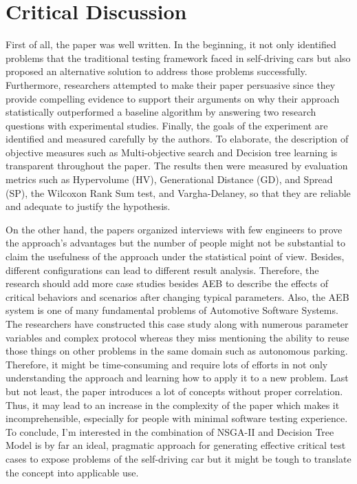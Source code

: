 \documentclass[10pt,a4paper]{report}
\begin{document}
\section{Critical Discussion}
First of all, the paper was well written. In the beginning, it not only identified problems that the traditional testing framework faced in self-driving cars but also proposed an alternative solution to address those problems successfully.
%
Furthermore, researchers attempted to make their paper persuasive since they provide compelling evidence to support their arguments on why their approach statistically outperformed a baseline algorithm by answering two research questions with experimental studies.  
%
Finally, the goals of the experiment are identified and measured carefully by the authors.
%
To elaborate, the description of objective measures such as Multi-objective search and Decision tree learning is transparent throughout the paper. 
%
The results then were measured by evaluation metrics such as Hypervolume (HV), Generational Distance (GD), and Spread (SP), the Wilcoxon Rank Sum test, and Vargha-Delaney, so that they are reliable and adequate to justify the hypothesis.
%

On the other hand, the papers organized interviews with few engineers to prove the approach's advantages but the number of people might not be substantial to claim the usefulness of the approach under the statistical point of view.
%
Besides, different configurations can lead to different result analysis. Therefore, the research should add more case studies besides AEB to describe the effects of critical behaviors and scenarios after changing typical parameters.
%
Also, the AEB system is one of many fundamental problems of Automotive Software Systems. 
%
The researchers have constructed this case study along with numerous parameter variables and complex protocol whereas they miss mentioning the ability to reuse those things on other problems in the same domain such as autonomous parking.
%
Therefore, it might be time-consuming and require lots of efforts in not only understanding the approach and learning how to apply it to a new problem.
%
Last but not least, the paper introduces a lot of concepts without proper correlation. 
%
Thus, it may lead to an increase in the complexity of the paper which makes it incomprehensible, especially for people with minimal software testing experience. 
%
To conclude, I’m interested in the combination of NSGA-II and Decision Tree Model is by far an ideal, pragmatic approach for generating effective critical test cases to expose problems of the self-driving car but it might be tough to translate the concept into applicable use.
\newpage 
\end{document}
